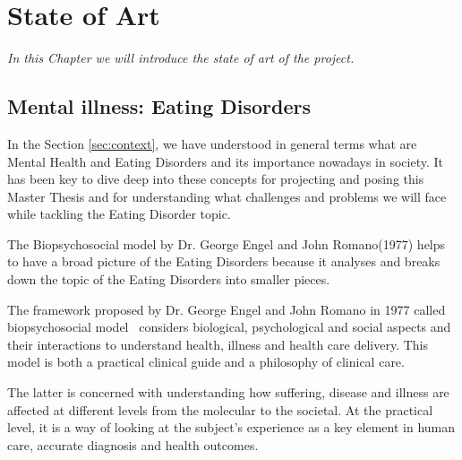 \chapter{State of Art}
\label{chap:state-of-art}
\textit{In this Chapter we will introduce the state of art of the project.}

\clearpage
\section{Mental illness: Eating Disorders}

In the Section \ref{sec:context}, we have understood in general terms what are Mental Health and Eating Disorders and its importance nowadays in society. It has been key to dive deep into these concepts for projecting and posing this Master Thesis and for understanding what challenges and problems we will face while tackling the Eating Disorder topic.

The Biopsychosocial model by Dr. George Engel and John Romano(1977) helps to have a broad picture of the Eating Disorders because it analyses and breaks down the topic of the Eating Disorders into smaller pieces.


The framework proposed by Dr. George Engel and John Romano in 1977 called biopsychosocial model~\cite{WhatisBi40:online} considers biological, psychological and social aspects and their interactions to understand health, illness and health care delivery. This model is both a practical clinical guide and a philosophy of clinical care. 

The latter is concerned with understanding how suffering, disease and illness are affected at different levels from the molecular to the societal. At the practical level, it is a way of looking at the subject's experience as a key element in human care, accurate diagnosis and health outcomes.%

